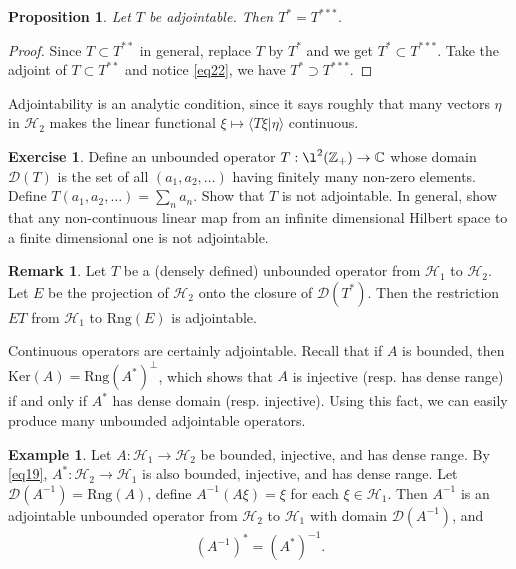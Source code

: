 \documentclass[12pt,a4paper,notitlepage]{article}
\theoremstyle{definition}
\newtheorem{eg}[df]{Example}
\newtheorem{exe}[df]{Exercise}
\newtheorem{rem}[df]{Remark}
\theoremstyle{plain}
\newtheorem{pp}[df]{Proposition}
\newcommand{\mc}{\mathcal}
\newcommand{\Dom}{\scr D}
\newcommand{\bk}[1]{\langle {#1}\rangle}
\newcommand{\scr}{\mathscr}
\newcommand{\Cbb}{\mathbb C}
\newcommand{\Zbb}{\mathbb Z}
\newcommand{\Rng}{\mathrm{Rng}}
\numberwithin{equation}{section}
\begin{document}
\begin{pp}\label{lb10}
Let $T$ be adjointable. Then $T^*=T^{***}$.
\end{pp}

\begin{proof}
Since $T\subset T^{**}$ in general, replace $T$ by $T^*$ and we get $T^*\subset T^{***}$. Take the adjoint of $T\subset T^{**}$ and notice \eqref{eq22}, we have $T^*\supset T^{***}$.
\end{proof}


Adjointability is an analytic condition, since it says roughly that many vectors  $\eta$ in $\mc H_2$ makes the linear functional $\xi\mapsto\bk{T\xi|\eta}$ continuous. 

\begin{exe}
Define an unbounded operator $T:\l^2(\Zbb_+)\rightarrow\Cbb$ whose domain $\Dom(T)$ is the set of all $(a_1,a_2,\dots)$ having finitely many non-zero elements. Define $T(a_1,a_2,\dots)=\sum_n a_n$. Show that $T$ is not adjointable. In general, show that any non-continuous linear map from an infinite dimensional Hilbert space to a finite dimensional one is not adjointable. 
\end{exe}


\begin{rem}
Let $T$ be a (densely defined) unbounded operator from $\mc H_1$ to $\mc H_2$. Let $E$ be the projection of $\mc H_2$ onto the closure of $\Dom(T^*)$. Then the restriction $ET$ from $\mc H_1$ to $\Rng(E)$ is adjointable.
\end{rem}


Continuous operators are certainly adjointable. Recall that if $A$ is bounded, then $\mathrm{Ker}(A)=\Rng(A^*)^\perp$, which shows that $A$ is injective (resp. has dense range) if and only if $A^*$ has dense domain (resp. injective). Using this fact, we can easily produce many unbounded adjointable operators.

\begin{eg}\label{lb13}
Let $A:\mc H_1\rightarrow\mc H_2$ be bounded, injective, and has dense range. By \eqref{eq19}, $A^*:\mc H_2\rightarrow\mc H_1$ is also bounded, injective, and has dense range. Let $\Dom(A^{-1})=\Rng(A)$, define $A^{-1}(A\xi)=\xi$ for each $\xi\in\mc H_1$. Then $A^{-1}$ is an adjointable unbounded operator from $\mc H_2$ to $\mc H_1$ with domain $\Dom(A^{-1})$, and
\begin{align}
(A^{-1})^*=(A^*)^{-1}.	\label{eq8}
\end{align}
\end{eg}
\end{document}
